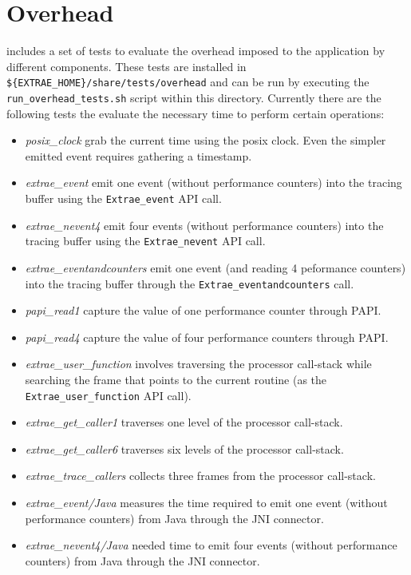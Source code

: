 \chapter{Overhead}\label{cha:Overhead}

\TRACE includes a set of tests to evaluate the overhead imposed to the application by different components.
These tests are installed in \texttt{\$\{EXTRAE\_HOME\}/share/tests/overhead} and can be run by executing the \texttt{run\_overhead\_tests.sh} script within this directory.
Currently there are the following tests the evaluate the necessary time to perform certain operations:
\begin{itemize}
\item \textit{posix\_clock} grab the current time using the posix clock. Even the simpler emitted event requires gathering a timestamp.
\item \textit{extrae\_event} emit one event (without performance counters) into the tracing buffer using the \texttt{Extrae\_event} API call.
\item \textit{extrae\_nevent4} emit four events (without performance counters) into the tracing buffer using the \texttt{Extrae\_nevent} API call.
\item \textit{extrae\_eventandcounters} emit one event (and reading 4 peformance counters) into the tracing buffer through the \texttt{Extrae\_eventandcounters} call.
\item \textit{papi\_read1} capture the value of one performance counter through PAPI.
\item \textit{papi\_read4} capture the value of four performance counters through PAPI.
\item \textit{extrae\_user\_function} involves traversing the processor call-stack while searching the frame that points to the current routine (as the \texttt{Extrae\_user\_function} API call).
\item \textit{extrae\_get\_caller1} traverses one level of the processor call-stack.
\item \textit{extrae\_get\_caller6} traverses six levels of the processor call-stack.
\item \textit{extrae\_trace\_callers} collects three frames from the processor call-stack.
\item \textit{extrae\_event/Java} measures the time required to emit one event (without performance counters) from Java through the JNI connector.
\item \textit{extrae\_nevent4/Java} needed time to emit four events (without performance counters) from Java through the JNI connector.
\end{itemize}

